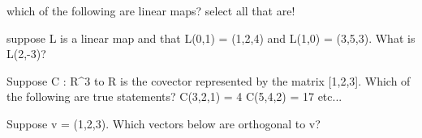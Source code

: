 which of the following are linear maps?  select all that are!

suppose L is a linear map and that L(0,1) = (1,2,4) and L(1,0) = (3,5,3).  What is L(2,-3)?

Suppose C : R^3 to R is the covector represented by the matrix [1,2,3].  Which of the following are true statements?
C(3,2,1) = 4
C(5,4,2) = 17
etc...

Suppose v = (1,2,3).  Which vectors below are orthogonal to v?
